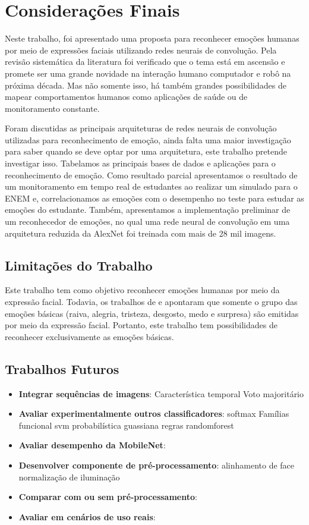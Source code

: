 \chapter{Considerações Finais}\label{sec:conclusao}
Neste trabalho, foi apresentado uma proposta para reconhecer emoções humanas por meio de expressões faciais utilizando redes neurais de convolução. Pela revisão sistemática da literatura foi verificado que o tema está em ascensão e promete ser uma grande novidade na interação humano computador e robô na próxima década. Mas não somente isso, há também grandes possibilidades de mapear comportamentos humanos como aplicações de saúde ou de monitoramento constante. 

Foram discutidas as principais arquiteturas de redes neurais de convolução utilizadas para reconhecimento de emoção, ainda falta uma maior investigação para saber quando se deve optar por uma arquitetura, este trabalho pretende investigar isso. Tabelamos as principais bases de dados e aplicações para o reconhecimento de emoção. Como resultado parcial apresentamos o resultado de um monitoramento em tempo real de estudantes ao realizar um simulado para o ENEM e, correlacionamos as emoções com o desempenho no teste para estudar as emoções do estudante. Também, apresentamos a implementação preliminar de um reconhecedor de emoções, no qual uma rede neural de convolução em uma arquitetura reduzida da AlexNet foi treinada com mais de 28 mil imagens.  


\section{Limitações do Trabalho}
Este trabalho tem como objetivo reconhecer emoções humanas por meio da expressão facial. Todavia, os trabalhos de \cite{darwin1965expression} e \cite{ekman1994} apontaram que somente o grupo das emoções básicas (raiva, alegria, tristeza, desgosto, medo e surpresa) são emitidas por meio da expressão facial. Portanto, este trabalho tem possibilidades de reconhecer exclusivamente as emoções básicas. 

\section{Trabalhos Futuros}
\begin{itemize}
 \item \textbf{Integrar sequências de imagens}: Característica temporal Voto majoritário 
 \item \textbf{Avaliar experimentalmente outros classificadores}: softmax Famílias funcional svm probabilística guassiana regras randomforest
 \item \textbf{Avaliar desempenho da MobileNet}: 
 \item \textbf{Desenvolver componente de pré-processamento}: alinhamento de face normalização de iluminação
 \item \textbf{Comparar com ou sem pré-processamento}: 
 \item \textbf{Avaliar em cenários de uso reais}: 
\end{itemize}



% 
